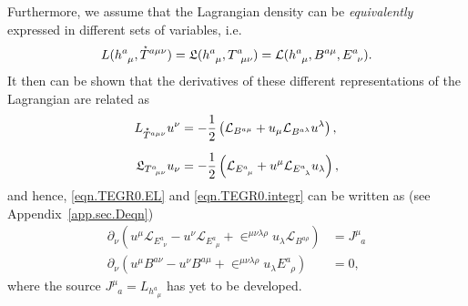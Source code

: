 \documentclass[
10pt, %
a4paper, %
oneside, %
twocolumn,
headinclude,footinclude, %
BCOR5mm, %
]{scrartcl}
\newcommand{\tetrsymbol}{h}
\newcommand{\tetr}[2]{\tetrsymbol^{#1}_{\phantom{#1}#2}}
\newcommand{\D}[1]{\partial_{#1}} %
\newcommand{\Tors}[2]{T^{#1}_{\phantom{#1}#2}}
\newcommand{\ET}[2]{E^{#1}_{\phantom{#1}#2}}	%
\newcommand{\BT}[2]{B^{#1#2}}	%
\newcommand{\Laghodge}{L}%
\newcommand{\Lagtors}{\mathfrak{L}}%
\newcommand{\LagBE}{\mathcal{L}}%
\newcommand{\LCsymb}{\bm{\in}}    %
\newcommand{\HDT}[1]{\accentset{\star}{T}^{#1}}
\newcommand{\NC}[2]{J^{#2}_{\phantom{#2}#1}}
\begin{document}
	Furthermore, we assume that the Lagrangian density can be \textit{equivalently} expressed in 
	different sets of variables, i.e. 
	\begin{equation}\label{eqn.Lagrangians2}
		\Laghodge(\tetr{a}{\mu},\HDT{a\mu\nu}) = \Lagtors(\tetr{a}{\mu},\Tors{a}{\mu\nu}) = 
		\LagBE(\tetr{a}{\mu},\BT{a}{\mu},\ET{a}{\nu}).
	\end{equation}
	It then can be shown that the derivatives of these different representations of the Lagrangian 
	are 
	related as
	\begin{subequations}
		\begin{align}
			\Laghodge_{\HDT{a\mu\nu}}u^\nu &= -\frac12\left( \LagBE_{\BT{a}{\mu}} +u_\mu 
			\LagBE_{\BT{a}{\lambda}} u^\lambda \right), \label{eqn.1st.order.EL}
			\\[2mm]
			\Lagtors_{\Tors{a}{\mu\nu}}u_\nu &= -\frac12\left( \LagBE_{\ET{a}{\mu}} + u^\mu 
			\LagBE_{\ET{a}{\lambda}} u_\lambda \right),
		\end{align}
	\end{subequations}
	and hence, \eqref{eqn.TEGR0.EL} and \eqref{eqn.TEGR0.integr} 
	can be written as (see Appendix~\eqref{app.sec.Deqn})
	\begin{subequations}\label{eqn.tors.BE}
		\begin{align}
			\D{\nu}( u^\mu\LagBE_{\ET{a}{\nu}} - u^\nu \LagBE_{\ET{a}{\mu}} + 
			\LCsymb^{\mu\nu\lambda\rho}u_\lambda\LagBE_{\BT{a}{\rho}}) 
			&= \NC{a}{\mu}\label{eqn.tors.BE.a} \\[2mm]
			\D{\nu}(u^\mu \BT{a}{\nu} - u^\nu\BT{a}{\mu} + 
			\LCsymb^{\mu\nu\lambda\rho}u_\lambda\ET{a}{\rho}) &= 0,
		\end{align}
	\end{subequations}
	where the source $ \NC{a}{\mu} = \Laghodge_{\tetr{a}{\mu}} $ has yet to be developed.
	
\end{document}
